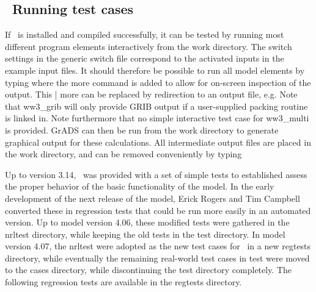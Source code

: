\vssub
\subsection{~Running test cases} \label{sec:tests}
\vssub

If \ws\ is installed and compiled successfully, it can be tested by running
most different program elements interactively from the {\file work}
directory. The switch settings in the generic switch file correspond to the
activated inputs in the example input files. It should therefore be possible
to run all model elements by typing
 where the {\code more} command is added to allow for
on-screen inspection of the output. This {\code | more} can be replaced by
redirection to an output file, e.g.  Note
that {\code ww3\_grib} will only provide GRIB output if a user-supplied
packing routine is linked in. Note furthermore that no simple interactive test
case for {\file ww3\_multi} is provided. GrADS can then be run from the work
directory to generate graphical output for these calculations. All
intermediate output files are placed in the {\file work} directory, and can be
removed conveniently by typing 

\vspace{\baselineskip} \noindent Up to version 3.14, \ws\ was provided with a
set of simple tests to established assess the proper behavior of the basic
functionality of the model. In the early development of the next release of
the model, Erick Rogers and Tim Campbell converted these in regression tests
that could be run more easily in an automated version. Up to model version
4.06, these modified tests were gathered in the {\file nrltest} directory,
while keeping the old tests in the {\file test} directory. In model version
4.07, the {\file nrltest} were adopted as the new test cases for \ws\ in a new
{\file regtests} directory, while eventually the remaining real-world test
cases in {\file test} were moved to the {\file cases} directory, while
discontinuing the {\file test} directory completely. The following regression
tests are available in the {\file regtests} directory.

